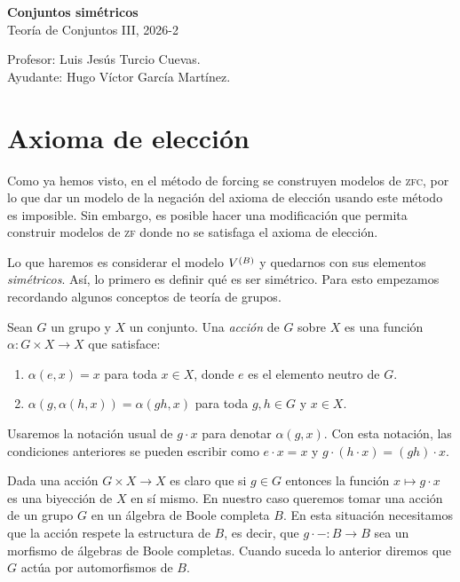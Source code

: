 \documentclass[letterpaper,DIV=15,12pt]{scrartcl}
\begin{document}
\thispagestyle{plain}

    \begin{center}
        {\fontsize{30}{60}\rmfamily \textbf{Conjuntos simétricos}} \\ \vspace{.2cm} Teoría de Conjuntos III, 2026-2
    \end{center}
    \begin{flushright}
        \footnotesize \hfill Profesor: Luis Jesús Turcio Cuevas.\\
        \hfill Ayudante: Hugo Víctor García Martínez.
    \end{flushright}

\section{Axioma de elección}

Como ya hemos visto, en el método de forcing se construyen modelos de
\textsc{zfc}, por lo que dar un modelo de la negación del axioma de elección
usando este método es imposible. Sin embargo, es posible hacer una modificación
que permita construir modelos de \textsc{zf} donde no se satisfaga el axioma de
elección. 

Lo que haremos es considerar el modelo \(\mb\) y quedarnos con sus elementos
\textit{simétricos}. Así, lo primero es definir qué es ser simétrico. Para esto
empezamos recordando algunos conceptos de teoría de grupos.

\begin{definition}
Sean \(G\) un grupo y \(X\) un conjunto. Una \emph{acción} de \(G\) sobre \(X\)
es una función \(\alpha\colon G\times X\to X\) que satisface:
\begin{enumerate}
    \item \(\alpha(e,x)=x\) para toda \(x\in X\), donde \(e\) es el elemento
    neutro de \(G\). 
    \item \(\alpha(g,\alpha(h,x))=\alpha(gh,x)\) para toda \(g,h\in G\) y 
    \(x\in X\).
\end{enumerate}
\end{definition}

Usaremos la notación usual de \(g\cdot x\) para denotar \(\alpha(g,x)\). Con
esta notación, las condiciones anteriores se pueden escribir como \(e\cdot x=x\)
y \(g\cdot(h\cdot x)=(gh)\cdot x\).

Dada una acción \(G\times X\to X\) es claro que si \(g\in G\) entonces la
función \(x\mapsto g\cdot x\) es una biyección de \(X\) en sí mismo. En nuestro
caso queremos tomar una acción de un grupo \(G\) en un álgebra de Boole completa
\(B\). En esta situación necesitamos que la acción respete la estructura de
\(B\), es decir, que \(g\cdot-\colon B\to B\) sea un morfismo de álgebras de
Boole completas. Cuando suceda lo anterior diremos que \(G\) actúa por
automorfismos de \(B\).
\end{document}
